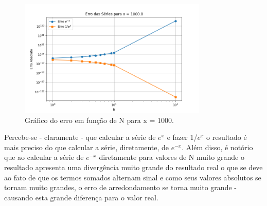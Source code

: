 \documentclass[12pt, a4paper]{article} %
\begin{document}
    \begin{figure}[H]
        \centering
        \includegraphics[width=0.8\textwidth]{../images/erro_x_1000_0.png}
        \caption{Gr\'afico do erro em fun\c{c}\~ao de N para x = 1000.}
    \end{figure}

    Percebe-se - claramente - que calcular a s\'erie de $e^x$ e fazer 1/$e^x$ o resultado \'e mais preciso do que calcular a s\'erie, diretamente, de $e^{-x}$. Al\'em disso, \'e not\'orio que ao calcular a s\'erie de $e^{-x}$  diretamente para valores de N muito grande o resultado apresenta uma diverg\^encia muito grande do resultado real o que se deve ao fato de que os termos somados alternam sinal e como seus valores absolutos se tornam muito grandes, o erro de arredondamento se torna muito grande - causando esta grande diferen\c{c}a para o valor real.
\end{document}
